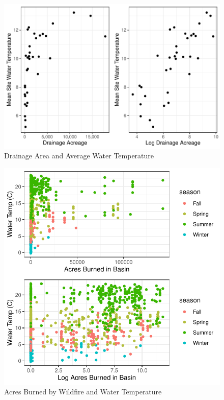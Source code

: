 \documentclass[
]{article}
\begin{document}
\begin{figure}
\centering
\includegraphics{D2P-Report_files/figure-latex/fig6-1.pdf}
\caption{\label{fig:figs6}Drainage Area and Average Water Temperature}
\end{figure}

\begin{figure}
\centering
\includegraphics{D2P-Report_files/figure-latex/fig7-1.pdf}
\caption{\label{fig:figs7}Acres Burned by Wildfire and Water
Temperature}
\end{figure}
\end{document}

